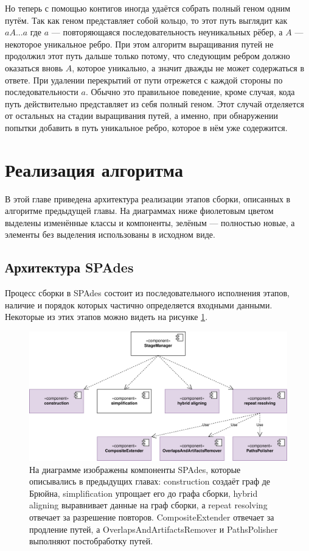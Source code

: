 \documentclass[14pt]{matmex-diploma-custom}
\begin{document}
Но теперь с помощью контигов иногда удаётся собрать полный геном одним путём. Так как геном представляет собой кольцо, то этот путь выглядит как $aA...a$ где $a$ --- повторяющаяся последовательность неуникальных рёбер, а $A$ --- некоторое уникальное ребро. При этом алгоритм выращивания путей не продолжил этот путь дальше только потому, что следующим ребром должно оказаться вновь $A$, которое уникально, а значит дважды не может содержаться в ответе. При удалении перекрытий от пути отрежется с каждой стороны по последовательности $a$. Обычно это правильное поведение, кроме случая, кода путь действительно представляет из себя полный геном. Этот случай отделяется от остальных на стадии выращивания путей, а именно, при обнаружении попытки добавить в путь уникальное ребро, которое в нём уже содержится.

\section{Реализация алгоритма}
В этой главе приведена архитектура реализации этапов сборки, описанных в алгоритме предыдущей главы. На диаграммах ниже фиолетовым цветом выделены изменённые классы и компоненты, зелёным --- полностью новые, а элементы без выделения использованы в исходном виде.

\subsection{Архитектура SPAdes}
Процесс сборки в SPAdes состоит из последовательного исполнения этапов, наличие и порядок которых частично определяется входными данными. Некоторые из этих этапов можно видеть на рисунке \ref{fig:commonArch}.

\begin{figure}[h]
	\centering
	\includegraphics[width=\textwidth]{commonArch.png}
	\caption{На диаграмме изображены компоненты SPAdes, которые описывались в предыдущих главах: construction создаёт граф де Брюйна, simplification упрощает его до графа сборки, hybrid aligning выравнивает данные на граф сборки, а repeat resolving отвечает за разрешение повторов. CompositeExtender отвечает за продление путей, а OverlapsAndArtifactsRemover и PathsPolisher выполняют постобработку путей.}
  	\label{fig:commonArch}
\end{figure}
\end{document}
